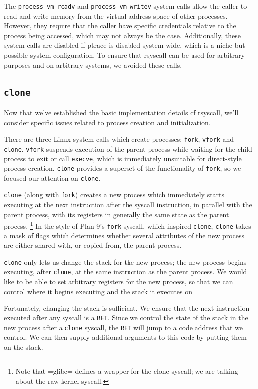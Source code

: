 \documentclass[sigplan]{acmart}
\begin{document}
The \verb|process_vm_readv| and \verb|process_vm_writev| system calls
allow the caller to read and write memory from the virtual address space of other processes.
However, they require that the caller have specific credentials relative to the process being accessed,
which may not always be the case.
Additionally, these system calls are disabled if ptrace is disabled system-wide,
which is a niche but possible system configuration.
To ensure that rsyscall can be used for arbitrary purposes and on arbitrary systems, we avoided these calls.
\subsection{\texttt{clone}}\label{clone}
Now that we've established the basic implementation details of rsyscall,
we'll consider specific issues related to process creation and initialization.

There are three Linux system calls which create processes:
\texttt{fork}, \texttt{vfork} and \texttt{clone}.
\texttt{vfork} suspends execution of the parent process
while waiting for the child process to exit or call \texttt{execve},
which is immediately unsuitable for direct-style process creation.
\texttt{clone} provides a superset of the functionality of \texttt{fork},
so we focused our attention on \texttt{clone}.

\texttt{clone} (along with \texttt{fork}) creates a new process
which immediately starts executing at the next instruction after the syscall instruction,
in parallel with the parent process,
with its registers in generally the same state as the parent process.
\footnote{Note that =glibc= defines a wrapper for the clone syscall;
we are talking about the raw kernel syscall.}
In the style of Plan 9's \texttt{fork} syscall\cite{rfork}, which inspired \texttt{clone},
\texttt{clone} takes a mask of flags which determines whether several attributes of the new process
are either shared with, or copied from, the parent process.

\texttt{clone} only lets us change the stack for the new process;
the new process begins executing, after \texttt{clone}, at the same instruction as the parent process.
We would like to be able to set arbitrary registers for the new process,
so that we can control where it begins executing and the stack it executes on.

Fortunately, changing the stack is sufficient.
We ensure that the next instruction executed after any syscall is a \texttt{RET}.
Since we control the state of the stack in the new process after a \texttt{clone} syscall,
the \texttt{RET} will jump to a code address that we control.
We can then supply additional arguments to this code
by putting them on the stack.
\end{document}

